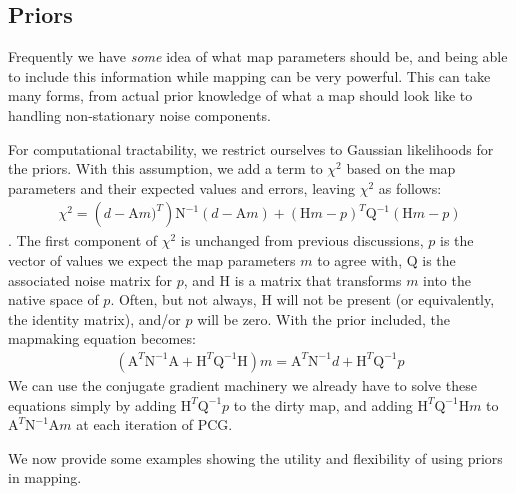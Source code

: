 \documentclass[12]{article}
\begin{document}
\subsection{Priors}
Frequently we have {\textit{some}} idea of what map parameters should
be, and being able to include this information while mapping can be
very powerful.  This can take many forms, from actual prior knowledge
of what a map should look like to handling non-stationary noise
components.  

For computational tractability, we restrict ourselves to
Gaussian likelihoods for the priors.  With this assumption, we add a
term to $\chi^2$ based on the map parameters and their expected values
and errors, leaving $\chi^2$ as follows:
\begin{eqnarray}
\label{eqn:prior_chisq}
\chi^2 = \left (d-\mathrm{A}m)^T \right ) \mathrm{N}^{-1} \left
(d-\mathrm{A}m \right ) + \left (\mathrm{H}m - p \right )^T \mathrm{Q}^{-1}
\left (\mathrm{H}m - p \right )
\end{eqnarray}
.  The first component of $\chi^2$ is unchanged from previous
discussions, $p$ is the vector of values we expect the map parameters
$m$ to agree with, $\mathrm{Q}$ is the associated noise matrix for $p$, and
$\mathrm{H}$ is a matrix that transforms $m$ into the native space of
$p$.  Often, but not always, $\mathrm{H}$ will not be present (or
equivalently, the identity matrix), and/or $p$ will be zero.  With the
prior included, the mapmaking equation becomes:
\begin{eqnarray}
\label{eqn:mapmaking_prior}
\left ( \mathrm{A}^T \mathrm{N}^{-1} \mathrm{A} + \mathrm{H}^T
\mathrm{Q}^{-1} \mathrm{H} \right ) m = \mathrm{A}^{T} \mathrm{N}^{-1}
d + \mathrm{H}^T \mathrm{Q}^{-1} p
\end{eqnarray}
We can use the conjugate gradient machinery we already have to solve
these equations simply by adding $\mathrm{H}^T \mathrm{Q}^{-1} p$ to
the dirty map, and adding $\mathrm{H}^T \mathrm{Q}^{-1} \mathrm{H}m $
to $ \mathrm{A}^T \mathrm{N}^{-1} \mathrm{A}m$ at each iteration of
PCG. 

We now provide some examples showing the utility and flexibility of
using priors in mapping.
\end{document}
